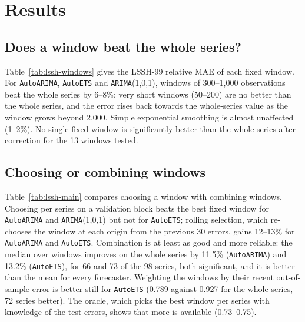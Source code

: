\documentclass[11pt]{article}
\begin{document}
\section{Results}
\label{sec:results}

\subsection{Does a window beat the whole series?}

Table~\ref{tab:lssh-windows} gives the LSSH-99 relative MAE of each fixed
window. For \texttt{AutoARIMA}, \texttt{AutoETS} and \texttt{ARIMA}(1,0,1),
windows of 300--1{,}000 observations beat the whole series by 6--8\%; very
short windows (50--200) are no better than the whole series, and the error
rises back towards the whole-series value as the window grows beyond 2{,}000.
Simple exponential smoothing is almost unaffected (1--2\%). No single fixed
window is significantly better than the whole series after correction for the
13 windows tested.

\begin{table}[t]
\centering\small
\caption{LSSH-99: relative MAE (geometric mean over 98 series of MAE divided by
the naive MAE; below 1 is better than naive) of each forecaster fitted to the
last $w$ observations at each of 30 one-step origins. Bold: best per row.}
\label{tab:lssh-windows}
\resizebox{\textwidth}{!}{}
\end{table}

\subsection{Choosing or combining windows}

Table~\ref{tab:lssh-main} compares choosing a window with combining windows.
Choosing per series on a validation block beats the best fixed window for
\texttt{AutoARIMA} and \texttt{ARIMA}(1,0,1) but not for \texttt{AutoETS}; rolling selection, which re-chooses the window
at each origin from the previous 30 errors, gains 12--13\% for
\texttt{AutoARIMA} and \texttt{AutoETS}. Combination is at least as good and
more reliable: the median over windows improves on the whole series by 11.5\%
(\texttt{AutoARIMA}) and 13.2\% (\texttt{AutoETS}), for 66 and 73 of the 98
series, both significant, and it is better than the mean for every forecaster.
Weighting the windows by their recent out-of-sample error is better still for
\texttt{AutoETS} (0.789 against 0.927 for the whole series, 72 series better).
The oracle, which picks the best window per series with knowledge of the test
errors, shows that more is available (0.73--0.75).
\end{document}
